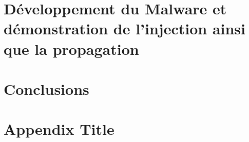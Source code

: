 \documentclass[12pt]{report}
\begin{document}
\chapter[Développement, Injection, Propagation]{Développement du Malware et démonstration de l'injection ainsi que la propagation}


\chapter{Conclusions}


\appendix
\chapter{Appendix Title}



\end{document}

